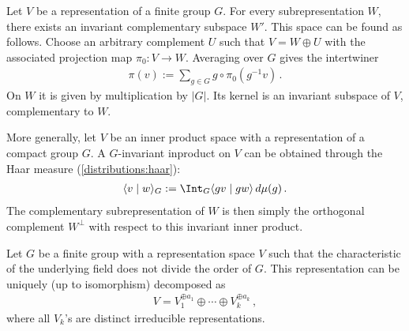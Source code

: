     \begin{property}
        Let $V$ be a representation of a finite group $G$. For every subrepresentation $W$, there exists an invariant complementary subspace $W'$. This space can be found as follows. Choose an arbitrary complement $U$ such that $V=W\oplus U$ with the associated projection map $\pi_0:V \rightarrow W$. Averaging over $G$ gives the intertwiner
        \begin{gather}
            \pi(v) := \sum_{g\in G}g\circ\pi_0(g^{-1}v)\,.
        \end{gather}
        On $W$ it is given by multiplication by $|G|$. Its kernel is an invariant subspace of $V$, complementary to $W$.

        More generally, let $V$ be an inner product space with a representation of a compact group $G$. A $G$-invariant inproduct on $V$ can be obtained through the Haar measure (\cref{distributions:haar}):
        \begin{gather}
            \langle v\mid w\rangle_G := \Int_G \langle gv\mid gw\rangle\,d\mu(g)\,.
        \end{gather}
        The complementary subrepresentation of $W$ is then simply the orthogonal complement $W^\perp$ with respect to this invariant inner product.
    \end{property}
    \begin{theorem}[Maschke]
        Let $G$ be a finite group with a representation space $V$ such that the characteristic of the underlying field does not divide the order of $G$. This representation can be uniquely (up to isomorphism) decomposed as
        \begin{gather}
            V = V_1^{\oplus a_1}\oplus\cdots\oplus V_k^{\oplus a_k}\,,
        \end{gather}
        where all $V_k$'s are distinct irreducible representations.
    \end{theorem}


